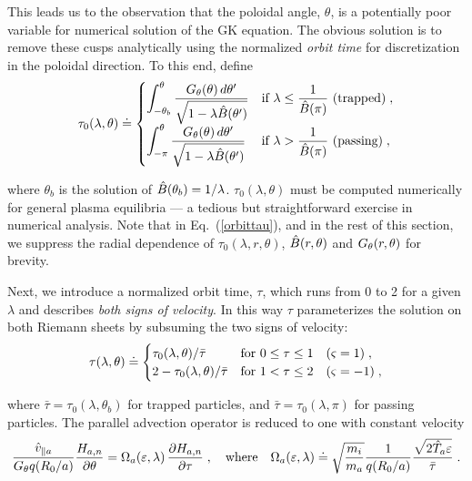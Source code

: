 This leads us to the observation that the poloidal angle, 
$\theta$, is a potentially poor variable for numerical solution 
of the GK equation.  The obvious solution is to remove these 
cusps analytically using the normalized {\it orbit time} for 
discretization in the poloidal direction.  To this end, 
define
%
\begin{equation}
\tau_0(\lambda,\theta) \doteq 
\begin{cases}
\displaystyle
\int_{-\theta_b}^{\theta} 
\frac{G_\theta(\theta)\, d\theta^\prime}{\sqrt{1-\lambda\hat{B}(\theta^\prime)}} &
\text{if $\displaystyle \lambda \leq \frac{1}{\hat{B}(\pi)}$ 
(trapped)} \; , \\
\displaystyle
\int_{-\pi}^{\theta} 
\frac{G_\theta(\theta)\, d\theta^\prime}{\sqrt{1-\lambda\hat{B}(\theta^\prime)}} &
\text{if $\displaystyle \lambda > \frac{1}{\hat{B}(\pi)}$ 
(passing)} \; ,
\end{cases}
\label{orbittau}
\end{equation}

\noindent
where $\theta_b$ is the solution of $\hat{B}(\theta_b) = 1/\lambda$.
$\tau_0(\lambda,\theta)$ must be computed numerically for general 
plasma equilibria --- a tedious but straightforward exercise 
in numerical analysis.  Note that in Eq.~(\ref{orbittau}), and in 
the rest of this section, we suppress the radial dependence 
of $\tau_0(\lambda,r,\theta)$, $\hat{B}(r,\theta)$ and $G_\theta(r,\theta)$
for brevity.

Next, we introduce a normalized orbit 
time, $\tau$, which runs from 0 to 2 for a given $\lambda$ and 
describes {\sl both signs of velocity}.  In this way $\tau$ 
parameterizes the solution on both Riemann sheets by subsuming 
the two signs of velocity:
%
\begin{equation}
\tau(\lambda,\theta) \doteq 
\begin{cases}
\displaystyle
\tau_0(\lambda,\theta) / \bar{\tau} & 
\text{for $0 \leq \tau \leq 1 \quad ({\varsigma} = 1)$} \; , \\
\displaystyle
2 - \tau_0(\lambda,\theta) / \bar{\tau} & 
\text{for $1 < \tau \leq 2 \quad ({\varsigma} = -1)$} \; ,
\end{cases}
\end{equation}

\noindent
where $\bar{\tau} = \tau_0(\lambda,\theta_b)$ for trapped particles, 
and $\bar{\tau} = \tau_0(\lambda,\pi)$ for passing particles.
The parallel advection operator is reduced to one with constant 
velocity
%
\begin{equation}
\frac{\hat{v}_{\parallel a}}{G_\theta q (R_0/a)} 
 \frac{H_{a,n}}{\partial\theta} = 
\Omega_a({\varepsilon},\lambda) \, \frac{\partial H_{a,n}}{\partial \tau} \; ,
\quad\hbox{where}\quad
\Omega_a({\varepsilon},\lambda) \doteq \sqrt{\frac{m_i}{m_a}} \frac{1}{q (R_0/a)} 
\frac{\sqrt{2 \hat{T}_a {\varepsilon}}}{\bar{\tau}} \; .
\label{constantv}
\end{equation}

